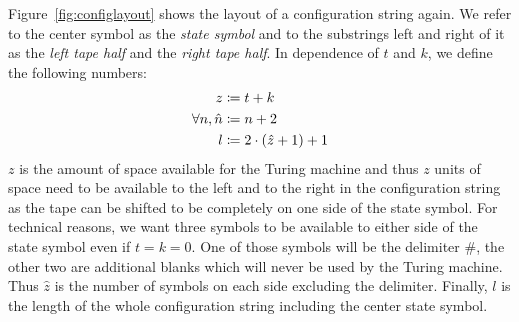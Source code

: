 Figure~\ref{fig:configlayout} shows the layout of a configuration string again. We refer to the center symbol as the \emph{state symbol} and to the substrings left and right of it as the \emph{left tape half} and the \emph{right tape half}.
In dependence of $t$ and $k$, we define the following numbers:
\begin{align*}
  z &\coloneqq t + k \\
  \forall n, \hat{n} &\coloneqq n + 2 \\
  l &\coloneqq 2 \cdot (\hat{z} + 1) + 1
\end{align*}
$z$ is the amount of space available for the Turing machine and thus $z$ units of space need to be available to the left and to the right in the configuration string as the tape can be shifted to be completely on one side of the state symbol.
For technical reasons, we want three symbols to be available to either side of the state symbol even if $t = k = 0$. One of those symbols will be the delimiter $\#$, the other two are additional blanks which will never be used by the Turing machine. Thus $\hat{z}$ is the number of symbols on each side excluding the delimiter. 
Finally, $l$ is the length of the whole configuration string including the center state symbol.

